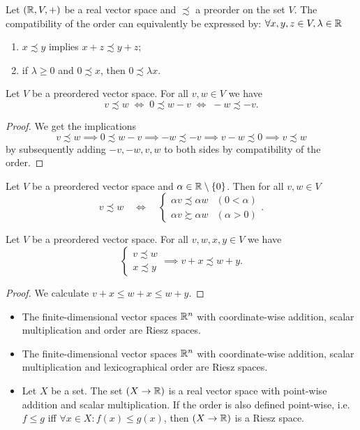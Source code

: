 \begin{lemma}
Let $\left( \mathbb{R}, V, + \right)$ be a real vector space and $\precsim$ a preorder on the set $V$. The compatibility of the order can equivalently be expressed by:
$\forall x,y,z\in V, \lambda\in\mathbb{R}$
\begin{enumerate}
\item $x \precsim y$ implies $x+z \precsim y+z$;
\item if $\lambda\geq 0$ and $0 \precsim x$, then $0 \precsim \lambda x$.
\end{enumerate}
\end{lemma}

\begin{lemma}
Let $V$ be a preordered vector space. For all $v,w \in V$ we have
\[ v \precsim w \;\iff\; 0 \precsim  w - v \;\iff\; -w \precsim -v.  \]
\end{lemma}
\begin{proof}
We get the implications
\[ v \precsim w \implies 0 \precsim  w - v \implies -w \precsim -v \implies v-w \precsim 0 \implies v\precsim w \]
by subsequently adding $-v, -w, v,w$ to both sides by compatibility of the order.
\end{proof}
\begin{corollary}
Let $V$ be a preordered vector space and $\alpha \in \mathbb{R}\setminus\{0\}$. Then for all $v,w\in V$
\[ v \precsim w \quad \iff \quad \begin{cases}
\alpha v \precsim \alpha w & (0 < \alpha) \\
\alpha v \succsim \alpha w & (\alpha > 0)
\end{cases}. \] 
\end{corollary}

\begin{lemma}
Let $V$ be a preordered vector space. For all $v,w, x, y \in V$ we have
\[ \begin{cases}
v \precsim w \\ x \precsim y
\end{cases} \implies v+ x \precsim w+y. \]
\end{lemma}
\begin{proof}
We calculate $v + x \leq w + x \leq w+y$.
\end{proof}

\begin{example}
\begin{itemize}
\item The finite-dimensional vector spaces $\mathbb{R}^n$ with coordinate-wise addition, scalar multiplication and order are Riesz spaces.
\item The finite-dimensional vector spaces $\mathbb{R}^n$ with coordinate-wise addition, scalar multiplication and lexicographical order are Riesz spaces.
\item Let $X$ be a set. The set $(X\to \mathbb{R})$ is a real vector space with point-wise addition and scalar multiplication. If the order is also defined point-wise, i.e. $f \leq g$ iff $\forall x\in X: f(x) \leq g(x)$, then $(X\to \mathbb{R})$ is a Riesz space.
\end{itemize}
\end{example}


